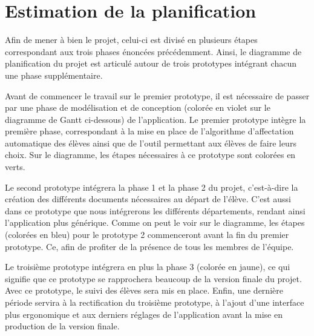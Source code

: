 \chapter{Estimation de la planification}

Afin de mener à bien le projet, celui-ci est divisé en plusieurs étapes correspondant aux trois phases énoncées précédemment.  Ainsi, le diagramme de planification du projet est articulé autour de trois prototypes intégrant chacun une phase supplémentaire. 

Avant de commencer le travail sur le premier prototype, il est nécessaire de passer par une phase de modélisation et de conception (colorée en violet sur le diagramme de Gantt ci-dessous) de l'application.
Le premier prototype intègre la première phase, correspondant à la mise en place de l'algorithme d'affectation automatique des élèves ainsi que de l'outil permettant aux élèves de faire leurs choix. Sur le diagramme, les étapes nécessaires à ce prototype sont colorées en verts.

Le second prototype intégrera la phase 1 et la phase 2 du projet, c'est-à-dire la création des différents documents nécessaires au départ de l'élève. C'est aussi dans ce prototype que nous intégrerons les différents départements, rendant ainsi l'application plus générique. Comme on peut le voir sur le diagramme, les étapes (colorées en bleu) pour le prototype 2 commenceront avant la fin du premier prototype. Ce, afin de profiter de la présence de tous les membres de l'équipe.

Le troisième prototype intégrera en plus la phase 3 (colorée en jaune), ce qui signifie que ce prototype se rapprochera beaucoup de la version finale du projet. Avec ce prototype, le suivi des élèves sera mis en place.
Enfin, une dernière période servira à la rectification du troisième prototype, à l'ajout d'une interface plus ergonomique et aux derniers réglages de l'application avant la mise en production de la version finale. 

